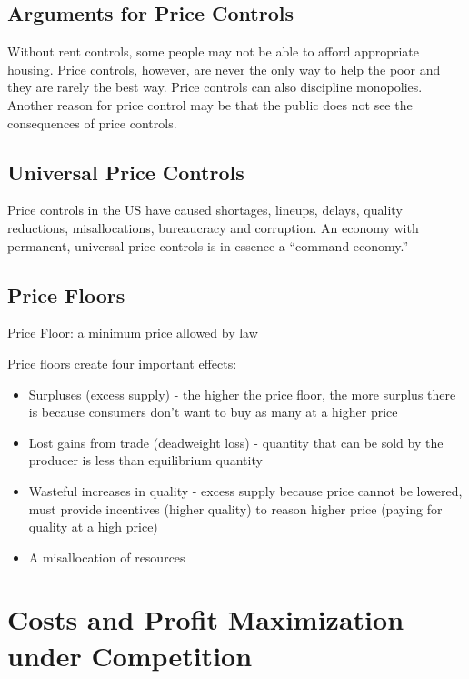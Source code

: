 \documentclass[12pt]{article}
\begin{document}
\subsection{Arguments for Price Controls} 
Without rent controls, some people may not be able to afford appropriate housing. Price controls, however, are never the only way to help the poor and they are rarely the best way. Price controls can also discipline monopolies. Another reason for price control may be that the public does not see the consequences of price controls. 

\subsection{Universal Price Controls}
Price controls in the US have caused shortages, lineups, delays, quality reductions, misallocations, bureaucracy and corruption.  An economy with permanent, universal price controls is in essence a ``command economy.''

\subsection{Price Floors}
\begin{definition} Price Floor: a minimum price allowed by law \end{definition}
Price floors create four important effects: \begin{itemize} 
\item Surpluses (excess supply) - the higher the price floor, the more surplus there is because consumers don't want to buy as many at a higher price
\item Lost gains from trade (deadweight loss) - quantity that can be sold by the producer is less than equilibrium quantity 
\item Wasteful increases in quality - excess supply because price cannot be lowered, must provide incentives (higher quality) to reason higher price (paying for quality at a high price) 
\item A misallocation of resources \end{itemize}


\section{Costs and Profit Maximization under Competition} 
\end{document}
